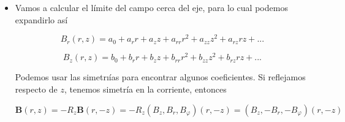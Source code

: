 \begin{itemize}
En el segundo t\'ermino, el versor $\hat{r}(\varphi)$ se puede escribir en coordenadas cartesianas como

$$\hat{r}(\varphi) = \cos \varphi \hat{x} + \sin \varphi \hat{y}$$

$$\Rightarrow \mathbf{B}_{r}(0, 0, z) = \frac{1}{c}nIa \int_{-\frac{L}{2}}^{\frac{L}{2}}dz' \int_{0}^{2\pi} d\varphi' \frac{z - z'}{(a + (z - z')^{2})^{\frac{3}{2}}}(\cos \varphi \hat{x} + \sin \varphi \hat{y}) = 0$$

ya que $\int_{0}^{2\pi} d\varphi' \sin \varphi' = \int_{0}^{2\pi} d\varphi' \cos \varphi' = 0$ \newline

Por otro lado, el primer t\'ermino lo podemos ver en tablas, y resulta

$$\mathbf{B}_{z}(0, 0, z) = \frac{2\pi}{c}nIa^{2} \int_{-\frac{L}{2}}^{\frac{L}{2}}dz' \frac{\hat{z}}{(a^{2} + (z - z')^{2})^{\frac{3}{2}}} = \frac{2\pi nIa^{2}}{c} \frac{-(z - z')}{a^{2}\sqrt{a^{2} + (z - z')^{2}}}\bigg|_{z' = -\frac{L}{2}}^{z' = \frac{L}{2}} \hat{z}$$

$$\Rightarrow \mathbf{B}_{z}(0, 0, z) = 2\pi \frac{nI}{c} \bigg[\frac{\frac{L}{2} + z}{\sqrt{(\frac{L}{2} + z)^{2} + a^{2}}} - \frac{-\frac{L}{2} + z}{\sqrt{(-\frac{L}{2} + z)^{2} + a^{2}}}\bigg]\hat{z}$$

$$ \Rightarrow \mathbf{B}(0, 0, z) = 2\pi \frac{nI}{c} (\cos \theta_{1} + \cos \theta_{2})\hat{z}$$

Cuando $L \rightarrow \infty$ (solenoide infinito), el campo nos queda

$$\lim_{L \rightarrow \infty} \mathbf{B}_{z}(0, 0, z) = 2\pi \frac{nI}{c} \lim_{L \rightarrow \infty} \bigg[\frac{\frac{L}{2} + z}{\sqrt{(\frac{L}{2} + z)^{2} + a^{2}}} - \frac{-\frac{L}{2} + z}{\sqrt{(-\frac{L}{2} + z)^{2} + a^{2}}}\bigg]\hat{z} = 2\pi \frac{nI}{c}(1 - (-1)) \hat{z} = 4\pi \frac{nI}{c}\hat{z}$$

\item Vamos a calcular el l\'imite del campo cerca del eje, para lo cual podemos expandirlo as\'i

$$B_{r}(r, z) = a_{0} + a_{r}r + a_{z}z + a_{rr}r^{2} + a_{zz}z^{2} + a_{rz}rz + ...$$

$$B_{z}(r, z) = b_{0} + b_{r}r + b_{z}z + b_{rr}r^{2} + b_{zz}z^{2} + b_{rz}rz + ...$$

Podemos usar las simetrı\'ias para encontrar algunos coeficientes. Si reflejamos respecto de $z$, tenemos simetr\'ia en la corriente, entonces

$$\mathbf{B}(r, z) = -R_{z} \mathbf{B}(r, -z) = -R_{z} (B_{z} , B_{r} , B_{\varphi})(r, -z) = (B_{z} , -B_{r} , -B_{\varphi})(r, -z)$$


\end{itemize}
